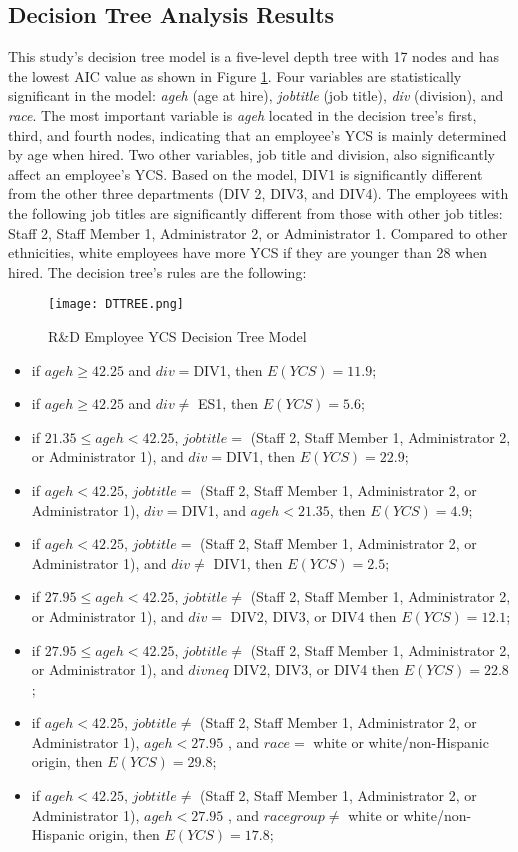 \subsection{Decision Tree Analysis Results}

This study's decision tree model is a five-level depth tree with 17 nodes and has the lowest AIC value as shown in Figure \ref{fig:DTM}. Four variables are statistically significant in the model: \textit{ageh} (age at hire), \textit{jobtitle} (job title), \textit{div} (division), and \textit{race}. The most important variable is \textit{ageh} located in the decision tree's first, third, and fourth nodes, indicating that an employee's YCS is mainly determined by age when hired. Two other variables, job title and division, also significantly affect an employee's YCS. Based on the model, DIV1 is significantly different from the other three departments (DIV 2, DIV3, and DIV4). The employees with the following job titles are significantly different from those with other job titles: Staff 2, Staff Member 1, Administrator 2, or Administrator 1. Compared to other ethnicities, white employees have more YCS if they are younger than 28 when hired. The decision tree's rules are the following:
\begin{figure}
	\centering
	\texttt{[image: DTTREE.png]}
	\caption{R\&D Employee YCS Decision Tree Model}
	\label{fig:DTM}
\end{figure}
\begin{itemize}
	\item if $ageh \ge 42.25 $ and $div=$DIV1, then  $E(YCS)=11.9$;
	\item if $ageh \ge  42.25$ and $div\neq$ ES1, then $E(YCS)=5.6$;
	\item if $21.35 \le ageh < 42.25$, $job title =$ (Staff 2, Staff Member 1, Administrator 2, or Administrator 1), and $div= $DIV1, then $E(YCS)=22.9$;
	\item if $ageh < 42.25$, $job title =$ (Staff 2, Staff Member 1, Administrator 2, or Administrator 1), $div= $DIV1, and $ageh < 21.35$, then $E(YCS)=4.9$;
	\item if $ageh < 42.25$, $job title =$ (Staff 2, Staff Member 1, Administrator 2, or Administrator 1), and $div\neq$ DIV1, then $E(YCS)=2.5$;
	\item if $27.95 \le ageh < 42.25$, $job title \neq $ (Staff 2, Staff Member 1, Administrator 2, or Administrator 1), and $div=$ DIV2, DIV3, or DIV4 then $E(YCS)=12.1$;
	\item if $27.95 \le ageh < 42.25$, $job title \neq $ (Staff 2, Staff Member 1, Administrator 2, or Administrator 1), and $div neq$ DIV2, DIV3, or DIV4 then $E(YCS)=22.8$;
	\item if $ ageh < 42.25 $, $job title \neq $ (Staff 2, Staff Member 1, Administrator 2, or Administrator 1), $ageh<27.95$ , and $race=$ white or white/non-Hispanic origin, then $E(YCS)=29.8$;
	\item if $ ageh < 42.25 $, $job title \neq $ (Staff 2, Staff Member 1, Administrator 2, or Administrator 1), $ageh<27.95$ , and $racegroup\neq$ white or white/non-Hispanic origin, then $E(YCS)=17.8$;
	
\end{itemize}
